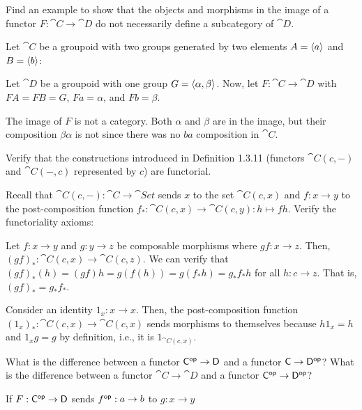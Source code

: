 \documentclass[notes,tikz]{agony}
\begin{document}
\begin{xca}
  Find an example to show that the objects and morphisms in the image of a functor
  $F : \cat C \to \cat D$ do not necessarily define a subcategory of $\cat D$.
\end{xca}
\begin{sol}
  Let $\cat C$ be a groupoid with two groups
  generated by two elements $A = \ev{a}$ and $B = \ev{b}$:
  \begin{center}
  \end{center}
  Let $\cat D$ be a groupoid with one group $G = \ev{\alpha,\beta}$.
  Now, let $F : \cat C \to \cat D$ with $FA = FB = G$,
  $Fa = \alpha$, and $Fb = \beta$.

  The image of $F$ is not a category.
  Both $\alpha$ and $\beta$ are in the image, but their composition $\beta\alpha$ is not
  since there was no $ba$ composition in $\cat C$.
\end{sol}

\begin{xca}
  Verify that the constructions introduced in Definition 1.3.11
  (functors $\cat C(c,-)$ and $\cat C(-,c)$ represented by $c$) are functorial.
\end{xca}
\begin{prf}
  Recall that $\cat C(c,-) : \cat C \to \cat{Set}$
  sends $x$ to the set $\cat C(c,x)$
  and $f : x \to y$ to the post-composition function
  $f_* : \cat C(c,x) \to \cat C(c,y) : h \mapsto fh$.
  Verify the functoriality axioms:

  Let $f : x \to y$ and $g : y \to z$ be composable morphisms where $gf : x \to z$.
  Then, $(gf)_* : \cat C(c,x) \to \cat C(c,z)$.
  We can verify that $(gf)_*(h) = (gf)h = g(f(h)) = g(f_*h) = g_*f_*h$ for all $h : c \to z$.
  That is, $(gf)_* = g_*f_*$.

  Consider an identity $1_x : x \to x$.
  Then, the post-composition function $(1_x)_* : \cat C(c,x) \to \cat C(c,x)$
  sends morphisms to themselves because $h1_x = h$ and $1_xg = g$ by definition,
  i.e., it is $1_{\cat C(c,x)}$.
\end{prf}

\begin{xca}
  What is the difference between a functor $\mathsf{C}^{\mathsf{op}} \to \mathsf{D}$
  and a functor $\mathsf{C} \to \mathsf{D}^{\mathsf{op}}$?
  What is the difference between a functor $\cat C \to \cat D$
  and a functor $\mathsf{C}^{\mathsf{op}} \to \mathsf{D}^{\mathsf{op}}$?
\end{xca}
\begin{sol}
  If $F : \mathsf{C}^{\mathsf{op}} \to \mathsf{D}$ sends $f^{\mathsf{op}} : a \to b$ to $g : x \to y$
\end{sol}
\end{document}
